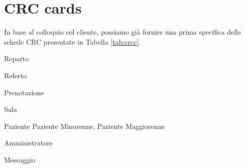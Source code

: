 \section{CRC cards}\label{sec:crccards}
In base al colloquio col cliente, possiamo già fornire una prima specifica delle
schede CRC presentate in Tabella \vref{tab:crcc}.
\begin{table}
\begin{center}
\begin{CRCcard}{Reparto}{ }{ }

\end{CRCcard}
\begin{CRCcard}{Referto}{ }{ }

\end{CRCcard}
\end{center}
\begin{center}
\begin{CRCcard}{Prenotazione}{ }{ }

\end{CRCcard}
\begin{CRCcard}{Sala}{ }{ }

\end{CRCcard}
\end{center}
\begin{center}
\begin{CRCcard}{Paziente}{ }{Paziente Minorenne, Paziente Maggiorenne}
\end{CRCcard}
\end{center}
\begin{center}
\begin{CRCcard}{Amministratore}{}{}
\end{CRCcard}
\end{center}
\begin{center}
\begin{CRCcard}{Messaggio}{ }{ }


\end{CRCcard}
\end{center}
\end{table}
